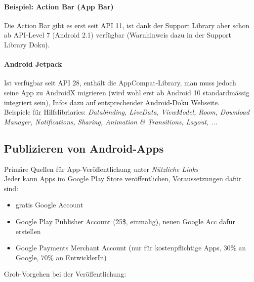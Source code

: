 \documentclass[a4paper]{article}
\begin{document}
		\paragraph{Beispiel: Action Bar (App Bar)}
		
		Die Action Bar gibt es erst seit API 11, ist dank der Support Library aber schon ab API-Level 7 (Android 2.1) verfügbar (Warnhinweis dazu in der Support Library Doku).
		
		\paragraph{Android Jetpack}
		
		Ist verfügbar seit API 28, enthält die AppCompat-Library, man muss jedoch seine App zu AndroidX migrieren (wird wohl erst ab Android 10 standardmässig integriert sein), Infos dazu auf entsprechender Android-Doku Webseite.\\
		Beispiele für Hilfslibriaries: \textit{Databinding, LiveData, ViewModel, Room, Download Manager, Notifications, Sharing, Animation \& Transitions, Layout, ...}
	
	\newpage
	
	\subsection{Publizieren von Android-Apps}
	
	Primäre Quellen für App-Veröffentlichung unter \textit{Nützliche Links}\\
	Jeder kann Apps im Google Play Store veröffentlichen, Voraussetzungen dafür sind:
	\begin{itemize}
		\item gratis Google Account
		\item Google Play Publisher Account (25\$, einmalig), neuen Google Acc dafür erstellen
		\item Google Payments Merchant Account (nur für kostenpflichtige Apps, 30\% an Google, 70\% an EntwicklerIn)\\
	\end{itemize}
	\noindent
	Grob-Vorgehen bei der Veröffentlichung:
	
\end{document}
